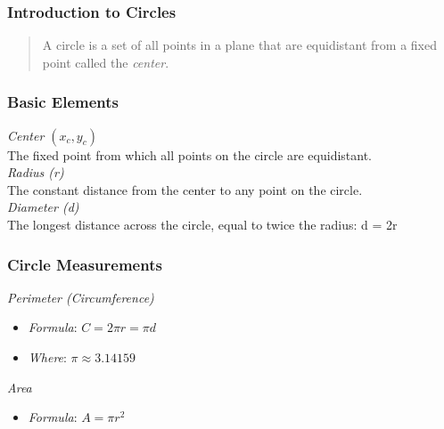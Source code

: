 \documentclass[a4paper,14pt]{article}
\begin{document}
\subsubsection{Introduction to Circles}
\begin{quote}
A circle is a set of all points in a plane that are equidistant from a fixed point called the \emph{center}.                                                                                                            \end{quote}
\subsubsection{Basic Elements}
\emph{Center \((x_c, y_c)\)}\\
The fixed point from which all points on the circle are equidistant.\\
\emph{Radius (r)}\\
The constant distance from the center to any point on the circle.\\
\emph{Diameter (d)}\\
The longest distance across the circle, equal to twice the radius: d = 2r\\
\subsubsection{Circle Measurements}
\emph{Perimeter (Circumference)}
\begin{itemize}
\item \emph{Formula}: \(C = 2 \pi r = \pi d \)
\item \emph{Where}: \(\pi \approx 3.14159\)
\end{itemize}
\emph{Area}
\begin{itemize}
\item \emph{Formula}: \( A = \pi r^2 \)\\
\end{itemize}
\end{document}
